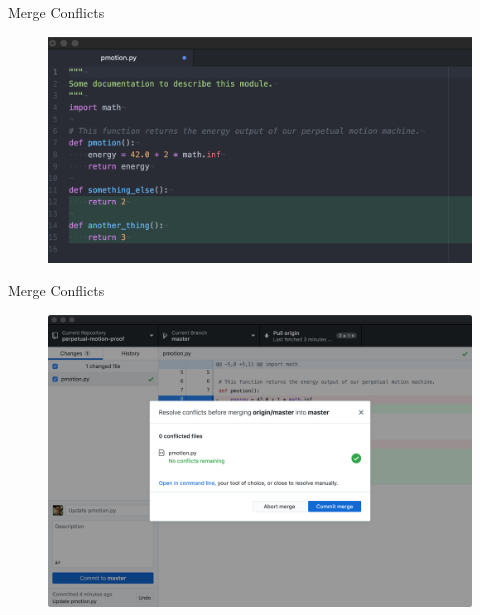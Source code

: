 \documentclass{beamer}
\begin{document}
    \begin{frame}{Merge Conflicts}
        \begin{figure}
            \centering
            \includegraphics[width=\textwidth]{figures/merge_4.png}
        \end{figure}
    \end{frame}

    \begin{frame}{Merge Conflicts}
        \begin{figure}
            \centering
            \includegraphics[width=\textwidth]{figures/merge_5.png}
        \end{figure}
    \end{frame}
\end{document}
